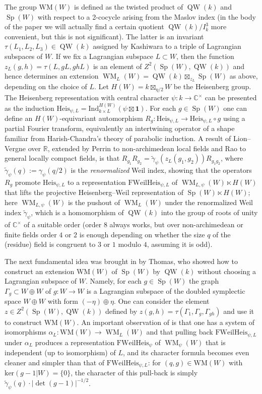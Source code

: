 \documentclass{article}
\def\tx#1{\textrm{#1}}
\def\R{\mathbb{R}}
\def\C{\mathbb{C}}
\DeclareMathOperator{\Sp}{Sp}
\theoremstyle{definition}
\numberwithin{equation}{subsection}
\renewcommand{\-}{\hyp{}}
\DeclareMathOperator{\WM}{WM}
\newcommand{\WMuniv}{\mathrm{WM}}
\DeclareMathOperator{\QW}{QW}
\begin{document}
The group $\WMuniv(W)$ is defined as the twisted product of $\QW(k)$ and $\Sp(W)$ with respect to a 2-cocycle arising from the Maslov index (in the body of the paper we will actually find a certain quotient $\QW(k)/I_k^3$ more convenient, but this is not significant). The latter is an invariant $\tau(L_1,L_2,L_3) \in \QW(k)$ assigned by Kashiwara to a triple of Lagrangian subspaces of $W$. If we fix a Lagrangian subspace $L \subset W$, then the function $z_L(g,h)=\tau(L,gL,ghL)$ is an element of $Z^2(\Sp(W),\QW(k))$ and hence determines an extension $\WM_L(W)=\QW(k)\boxtimes_{z_L}\Sp(W)$ as above, depending on the choice of $L$. Let $H(W)=k \boxtimes_{\eta/2} W$ be the  Heisenberg group. The Heisenberg representation with central character $\psi : k \to \C^\times$ can be presented as the induction $\tx{Heis}_{\psi,L}=\tx{Ind}_{k \times L}^{H(W)}(\psi\boxtimes \mathbf{1})$. For each $g \in \Sp(W)$ one can define an $H(W)$-equivariant automorphism $R_g : \tx{Heis}_{\psi,L} \to \tx{Heis}_{\psi,L}\circ g$ using a partial Fourier transform, equivalently an intertwining operator of a shape familiar from Harish-Chandra's theory of parabolic induction. A result of Lion--Vergne over $\R$, extended by Perrin to non-archimedean local fields and Rao to general locally compact fields, is that $R_{g_1}R_{g_2}=\tilde\gamma_\psi(z_L(g_1,g_2))R_{g_1g_2}$, where $\tilde\gamma_\psi(q):=\gamma_\psi(q/2)$ is the \emph{renormalized} Weil index, showing that the operators $R_g$ promote $\tx{Heis}_{\psi,L}$ to a representation $\mathrm{FWeilHeis}_{\psi,L}$ of $\WM_{L,\psi}(W) \ltimes H(W)$ that lifts the projective Heisenberg--Weil representation of $\Sp(W) \ltimes H(W)$; here $\WM_{L,\psi}(W)$ is the pushout of $\WM_L(W)$ under the renormalized Weil index $\tilde\gamma_\psi$, which is a homomorphism of $\QW(k)$ into the group of roots of unity of $\C^\times$ of a suitable order (order $8$ always works, but over non-archimedean or finite fields order $4$ or $2$ is enough depending on whether the size $q$ of the (residue) field is congruent to $3$ or $1$ modulo $4$, assuming it is odd).

The next fundamental idea was brought in by Thomas, who showed how to construct an extension $\WMuniv(W)$ of $\Sp(W)$ by $\QW(k)$ without choosing a Lagrangian subspace of $W$. Namely, for each $g \in \Sp(W)$ the graph $\Gamma_g \subset W \oplus W$ of $g : W \to W$ is a Lagrangian subspace of the doubled symplectic space $W \oplus W$ with form $(-\eta) \oplus \eta$. One can consider the element $z \in Z^2(\Sp(W),\QW(k))$ defined by $z(g,h)=\tau(\Gamma_1,\Gamma_g,\Gamma_{gh})$ and use it to construct $\WMuniv(W)$. An important observation of \cite{Thomas2013} is that one has a system of isomorphisms $\alpha_L : \WMuniv(W) \to \WM_L(W)$ and that pulling back $\mathrm{FWeilHeis}_{\psi,L}$ under $\alpha_L$ produces a representation $\mathrm{FWeilHeis}_\psi$ of $\WM_\psi(W)$ that is independent (up to isomorphism) of $L$, and its character formula becomes even cleaner and simpler than that of $\mathrm{FWeilHeis}_{\psi,L}$: for $(q,g) \in \WMuniv(W)$ with $\tx{ker}(g-1|W)=\{0\}$, the character of this pull-back is simply $\tilde\gamma_\psi(q)\cdot |\det(g-1)|^{-1/2}$.
\end{document}
